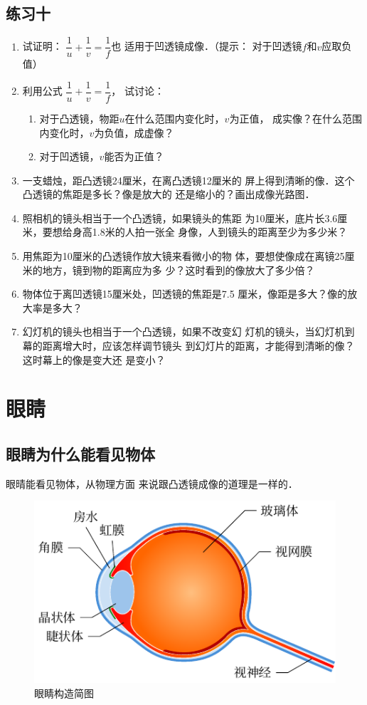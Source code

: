 \subsection*{练习十}

\begin{enumerate}
    \item 试证明：
$\dfrac{1}{u}+\dfrac{1}{v}=\dfrac{1}{f}$也
适用于凹透镜成像．（提示：
对于凹透镜$f$和$v$应取负值）
\item  利用公式
$\dfrac{1}{u}+\dfrac{1}{v}=\dfrac{1}{f}$，
试讨论：
\begin{enumerate}
    \item 对于凸透镜，物距$u$在什么范围内变化时，$v$为正值，
    成实像？在什么范围内变化时，$v$为负值，成虚像？
    \item 对于凹透镜，$v$能否为正值？
\end{enumerate}
\item 一支蜡烛，距凸透镜24厘米，在离凸透镜12厘米的
屏上得到清晰的像．这个凸透镜的焦距是多长？像是放大的
还是缩小的？画出成像光路图．
\item 照相机的镜头相当于一个凸透镜，如果镜头的焦距
为10厘米，底片长3.6厘米，要想给身高1.8米的人拍一张全
身像，人到镜头的距离至少为多少米？
\item 用焦距为10厘米的凸透镜作放大镜来看微小的物
体，要想使像成在离镜25厘米的地方，镜到物的距离应为多
少？这时看到的像放大了多少倍？
\item 物体位于离凹透镜15厘米处，凹透镜的焦距是7.5
厘米，像距是多大？像的放大率是多大？
\item 幻灯机的镜头也相当于一个凸透镜，如果不改变幻
灯机的镜头，当幻灯机到幕的距离增大时，应该怎样调节镜头
到幻灯片的距离，才能得到清晰的像？这时幕上的像是变大还
是变小？
\end{enumerate}

\section{眼睛}
\subsection{眼睛为什么能看见物体}

眼晴能看见物体，从物理方面
来说跟凸透镜成像的道理是一样的．
\begin{figure}[htbp]
    \centering
    \includegraphics{fig/C/5-49.pdf}
    \caption{眼睛构造简图}\label{fig_C_5-49}
\end{figure}

